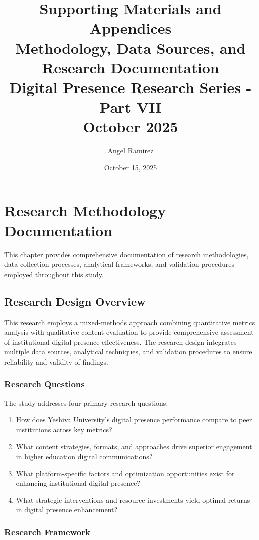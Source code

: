 \documentclass[12pt]{report}
\title{
    \Huge\textbf{Supporting Materials and Appendices}\\[1cm]
    \Large\textbf{Methodology, Data Sources, and Research Documentation}\\[0.5cm]
    \large Digital Presence Research Series - Part VII\\[1cm]
    \normalsize October 2025
}
\author{Angel Ramirez}
\date{October 15, 2025}
\begin{document}
\maketitle

\tableofcontents

\chapter{Research Methodology Documentation}

This chapter provides comprehensive documentation of research methodologies, data collection processes, analytical frameworks, and validation procedures employed throughout this study.

\section{Research Design Overview}

This research employs a mixed-methods approach combining quantitative metrics analysis with qualitative content evaluation to provide comprehensive assessment of institutional digital presence effectiveness. The research design integrates multiple data sources, analytical techniques, and validation procedures to ensure reliability and validity of findings.

\subsection{Research Questions}

The study addresses four primary research questions:

\begin{enumerate}
\item How does Yeshiva University's digital presence performance compare to peer institutions across key metrics?
\item What content strategies, formats, and approaches drive superior engagement in higher education digital communications?
\item What platform-specific factors and optimization opportunities exist for enhancing institutional digital presence?
\item What strategic interventions and resource investments yield optimal returns in digital presence enhancement?
\end{enumerate}

\subsection{Research Framework}
\end{document}
